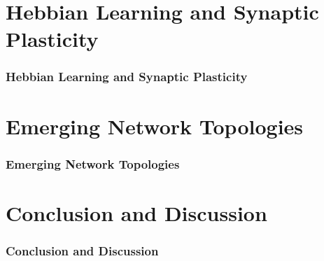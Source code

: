 \section{Hebbian Learning and Synaptic Plasticity} 
\begin{frame}
\frametitle{Hebbian Learning and Synaptic Plasticity}
\end{frame}


\section{\mywork Emerging Network Topologies} 
\begin{frame}
\frametitle{\mywork Emerging Network Topologies}
\end{frame}


\section{Conclusion and Discussion} 
\begin{frame}
\frametitle{Conclusion and Discussion}
\end{frame}
